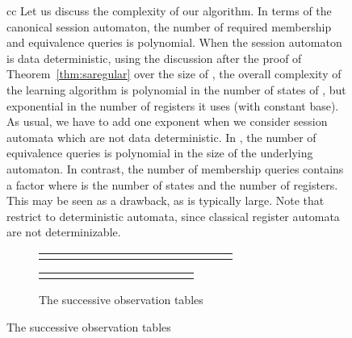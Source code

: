 \documentclass{LMCS}
\begin{document}
\begin{figure}[t]
\begin{tabular}{cc}
Let us discuss the complexity of our algorithm. In terms of the
canonical session automaton, the number of required membership and
equivalence queries is polynomial. When the session automaton  is
data deterministic, using the discussion after the proof of
Theorem~\ref{thm:saregular} over the size of , the overall
complexity of the learning algorithm is polynomial in the number of
states of , but exponential in the number of registers it uses
(with constant base). As usual, we have to add one exponent when we
consider session automata which are not data deterministic. In
\cite{HowarSJC12}, the number of equivalence queries is polynomial in
the size of the underlying automaton. In contrast, the number of
membership queries contains a factor  where  is the number of
states and  the number of registers.  This may be seen as a
drawback, as  is typically large.  Note that \cite{HowarSJC12}
restrict to deterministic automata, since classical register automata
are not determinizable.

\begin{figure}[ht]
\begin{center}
{\footnotesize
\noindent
\begin{tabular}{lllllllllllllll}

&\raisebox{-2ex}{}&

&\raisebox{-2ex}{}&

&\raisebox{-2ex}{}&
\end{tabular}

\vspace*{2ex}

\begin{tabular}{llllllllllll}

&\raisebox{-2ex}{}&

\end{tabular}}
\end{center}
\caption{\label{fig:learning}The successive observation tables}
\end{figure}


\end{tabular}
\end{figure}
\end{document}

